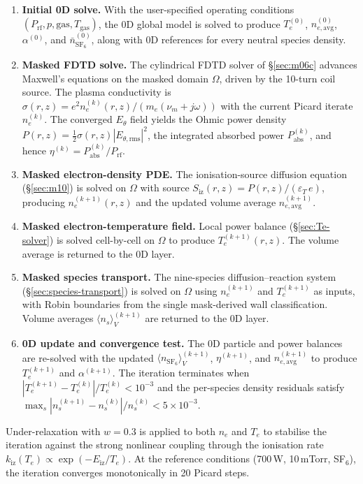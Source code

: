 \documentclass[11pt,a4paper]{report}
\begin{document}
\begin{enumerate}
  \item \textbf{Initial 0D solve.}  With the user-specified operating conditions $(P_\mathrm{rf}, p, \mathrm{gas}, T_\mathrm{gas})$, the 0D global model is solved to produce $T_e^{(0)}$, $n_{e,\mathrm{avg}}^{(0)}$, $\alpha^{(0)}$, and $\bar n_{\mathrm{SF}_6}^{(0)}$, along with 0D references for every neutral species density.
  \item \textbf{Masked FDTD solve.}  The cylindrical FDTD solver of \S\ref{sec:m06c} advances Maxwell's equations on the masked domain $\Omega$, driven by the 10-turn coil source.  The plasma conductivity is $\sigma(r,z) = e^2 n_e^{(k)}(r,z) / (m_e (\nu_m + j\omega))$ with the current Picard iterate $n_e^{(k)}$.  The converged $E_\theta$ field yields the Ohmic power density $P(r,z) = \tfrac{1}{2}\sigma(r,z)|E_{\theta,\mathrm{rms}}|^2$, the integrated absorbed power $P_\mathrm{abs}^{(k)}$, and hence $\eta^{(k)} = P_\mathrm{abs}^{(k)}/P_\mathrm{rf}$.
  \item \textbf{Masked electron-density PDE.}  The ionisation-source diffusion equation (\S\ref{sec:m10}) is solved on $\Omega$ with source $S_\mathrm{iz}(r,z) = P(r,z)/(\varepsilon_T\,e)$, producing $n_e^{(k+1)}(r,z)$ and the updated volume average $n_{e,\mathrm{avg}}^{(k+1)}$.
  \item \textbf{Masked electron-temperature field.}  Local power balance (\S\ref{sec:Te-solver}) is solved cell-by-cell on $\Omega$ to produce $T_e^{(k+1)}(r,z)$.  The volume average is returned to the 0D layer.
  \item \textbf{Masked species transport.}  The nine-species diffusion--reaction system (\S\ref{sec:species-transport}) is solved on $\Omega$ using $n_e^{(k+1)}$ and $T_e^{(k+1)}$ as inputs, with Robin boundaries from the single mask-derived wall classification.  Volume averages $\langle n_s \rangle_V^{(k+1)}$ are returned to the 0D layer.
  \item \textbf{0D update and convergence test.}  The 0D particle and power balances are re-solved with the updated $\langle n_{\mathrm{SF}_6}\rangle_V^{(k+1)}$, $\eta^{(k+1)}$, and $n_{e,\mathrm{avg}}^{(k+1)}$ to produce $T_e^{(k+1)}$ and $\alpha^{(k+1)}$.  The iteration terminates when $|T_e^{(k+1)} - T_e^{(k)}|/T_e^{(k)} < 10^{-3}$ and the per-species density residuals satisfy $\max_s |n_s^{(k+1)} - n_s^{(k)}|/n_s^{(k)} < 5 \times 10^{-3}$.
\end{enumerate}

Under-relaxation with $w = 0.3$ is applied to both $n_e$ and $T_e$ to stabilise the iteration against the strong nonlinear coupling through the ionisation rate $k_\mathrm{iz}(T_e) \propto \exp(-E_\mathrm{iz}/T_e)$.  At the reference conditions (700\,W, 10\,mTorr, SF$_6$), the iteration converges monotonically in 20 Picard steps.
\end{document}

